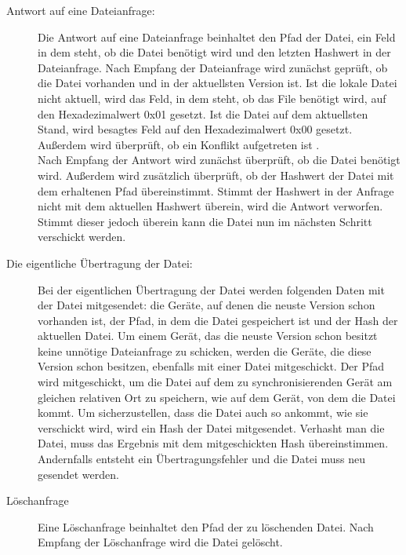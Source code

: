 \begin{description}
	\item [{Antwort auf eine Dateianfrage:}]
		Die Antwort auf eine Dateianfrage beinhaltet den Pfad der Datei, ein Feld in dem steht, ob die Datei benötigt wird und den letzten Hashwert in der Dateianfrage. Nach Empfang der Dateianfrage wird zunächst geprüft, ob die Datei vorhanden und in der aktuellsten Version ist.  Ist die lokale Datei nicht aktuell, wird das Feld, in dem steht, ob das File benötigt wird, auf den Hexadezimalwert 0x01 gesetzt. Ist die Datei auf dem aktuellsten Stand, wird besagtes Feld auf den Hexadezimalwert 0x00 gesetzt. Außerdem wird überprüft, ob ein Konflikt aufgetreten ist .\\
		Nach Empfang der Antwort wird zunächst überprüft, ob die Datei benötigt wird. Außerdem wird zusätzlich überprüft, ob der Hashwert der Datei mit dem erhaltenen Pfad übereinstimmt. Stimmt der Hashwert in der Anfrage nicht mit dem aktuellen Hashwert überein, wird die Antwort verworfen. Stimmt dieser jedoch überein kann die Datei nun im nächsten Schritt verschickt werden.
		
	\item [{Die eigentliche Übertragung der Datei:}]
		Bei der eigentlichen Übertragung der Datei werden folgenden Daten mit der Datei mitgesendet: die Geräte, auf denen die neuste Version schon vorhanden ist, der Pfad, in dem die Datei gespeichert ist und der Hash der aktuellen Datei. Um einem Gerät, das die neuste Version schon besitzt keine unnötige Dateianfrage zu schicken, werden die Geräte, die diese Version schon besitzen, ebenfalls mit einer Datei mitgeschickt. Der Pfad wird mitgeschickt, um die Datei auf dem zu synchronisierenden Gerät am gleichen relativen Ort zu speichern, wie auf dem Gerät, von dem die Datei kommt. Um sicherzustellen, dass die Datei auch so ankommt, wie sie verschickt wird, wird ein Hash der Datei mitgesendet. Verhasht man die Datei, muss das Ergebnis mit dem mitgeschickten Hash übereinstimmen. Andernfalls entsteht ein Übertragungsfehler und die Datei muss neu gesendet werden.
		
	\item [{Löschanfrage}]
		Eine Löschanfrage beinhaltet den Pfad der zu löschenden Datei. Nach Empfang der Löschanfrage wird die Datei gelöscht.
		
\end{description}

